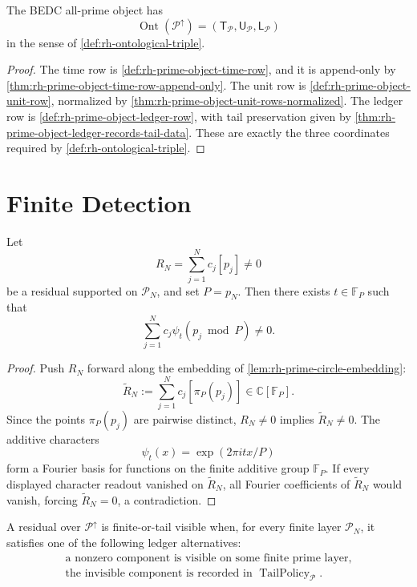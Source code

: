 \begin{theorem}
\label{thm:rh-all-prime-object-has-ontological-triple}
The BEDC all-prime object has
$$
\operatorname{Ont}(\mathcal P^\uparrow)
=
(\mathsf T_{\mathcal P},\mathsf U_{\mathcal P},\mathsf L_{\mathcal P})
$$
in the sense of \autoref{def:rh-ontological-triple}.
\end{theorem}

\begin{proof}
The time row is
\autoref{def:rh-prime-object-time-row}, and it is append-only by
\autoref{thm:rh-prime-object-time-row-append-only}.  The unit row is
\autoref{def:rh-prime-object-unit-row}, normalized by
\autoref{thm:rh-prime-object-unit-rows-normalized}.  The ledger row is
\autoref{def:rh-prime-object-ledger-row}, with tail preservation given
by \autoref{thm:rh-prime-object-ledger-records-tail-data}.  These are
exactly the three coordinates required by
\autoref{def:rh-ontological-triple}.
\end{proof}

\section{Finite Detection}
\label{sec:rh-all-prime-object-finite-detection}

\begin{theorem}
\label{thm:rh-prime-circle-layer-detects-finite-prime-residuals}
Let
$$
R_N=\sum_{j=1}^{N}c_j[p_j]\ne0
$$
be a residual supported on $\mathcal P_N$, and set $P=p_N$.  Then
there exists $t\in\mathbb F_P$ such that
$$
\sum_{j=1}^{N}c_j\psi_t(p_j\bmod P)\ne0.
$$
\end{theorem}

\begin{proof}
Push $R_N$ forward along the embedding of
\autoref{lem:rh-prime-circle-embedding}:
$$
\widetilde R_N
:=
\sum_{j=1}^{N}c_j[\pi_P(p_j)]
\in
\mathbb C[\mathbb F_P].
$$
Since the points $\pi_P(p_j)$ are pairwise distinct, $R_N\ne0$ implies
$\widetilde R_N\ne0$.  The additive characters
$$
\psi_t(x)=\exp(2\pi i tx/P)
$$
form a Fourier basis for functions on the finite additive group
$\mathbb F_P$.  If every displayed character readout vanished on
$\widetilde R_N$, all Fourier coefficients of $\widetilde R_N$ would
vanish, forcing $\widetilde R_N=0$, a contradiction.
\end{proof}

\begin{definition}
\label{def:rh-finite-or-tail-prime-residual}
A residual over $\mathcal P^\uparrow$ is finite-or-tail visible when,
for every finite layer $\mathcal P_N$, it satisfies one of the following
ledger alternatives:
$$
\begin{gathered}
\text{a nonzero component is visible on some finite prime layer},\\
\text{the invisible component is recorded in }
\operatorname{TailPolicy}_{\mathcal P}.
\end{gathered}
$$
\end{definition}

